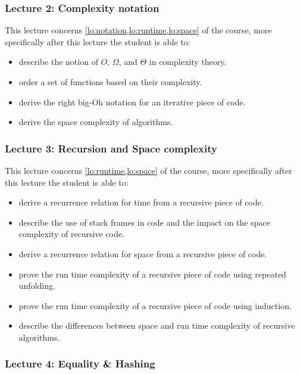\subsubsection*{Lecture 2: Complexity notation}
\label{sub:lecture_2}

This lecture concerns \cref{lo:notation,lo:runtime,lo:space} of the course, more specifically after this lecture the
student is able to:
\begin{itemize}
	\item describe the notion of $O$, $\Omega$, and $\Theta$ in complexity theory.
	\item order a set of functions based on their complexity.
	\item derive the right big-Oh notation for an iterative piece of code.
	\item derive the space complexity of algorithms.
\end{itemize}

\subsubsection*{Lecture 3: Recursion and Space complexity}
\label{sub:lecture_3}

This lecture concerns \cref{lo:runtime,lo:space} of the course, more specifically after this lecture the student is able
to:
\begin{itemize}
	\item derive a recurrence relation for time from a recursive piece of code.
	\item describe the use of stack frames in code and the impact on the space complexity of recursive code.
	\item derive a recurrence relation for space from a recursive piece of code.
	\item prove the run time complexity of a recursive piece of code using repeated unfolding.
	\item prove the run time complexity of a recursive piece of code using induction.
	\item describe the differences between space and run time complexity of recursive algorithms.
\end{itemize}

\subsubsection*{Lecture 4: Equality \& Hashing}
\label{sub:lecture_4}

